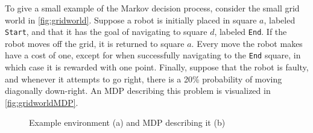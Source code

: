 To give a small example of the Markov decision process, consider the small grid world in \cref{fig:gridworld}. 
Suppose a robot is initially placed in square $a$, labeled \texttt{Start}, and that it has the goal of navigating to square $d$, labeled \texttt{End}. 
If the robot moves off the grid, it is returned to square $a$. 
Every move the robot makes have a cost of one, except for when successfully navigating to the \texttt{End} square, in which case it is rewarded with one point. 
Finally, suppose that the robot is faulty, and whenever it attempts to go right, there is a 20\% probability of moving diagonally down-right.
An MDP describing this problem is visualized in \cref{fig:gridworldMDP}.

\begin{figure}[!htb]
    \centering
    \begin{minipage}[t]{0.34\textwidth}
        \centering
        \label{fig:gridworld}
    \end{minipage}
    \begin{minipage}[t]{0.6\textwidth}
        \centering
        \label{fig:gridworldMDP}
    \end{minipage}
    \caption{Example environment (a) and MDP describing it (b)}
    \label{fig:MDP}
\end{figure}


